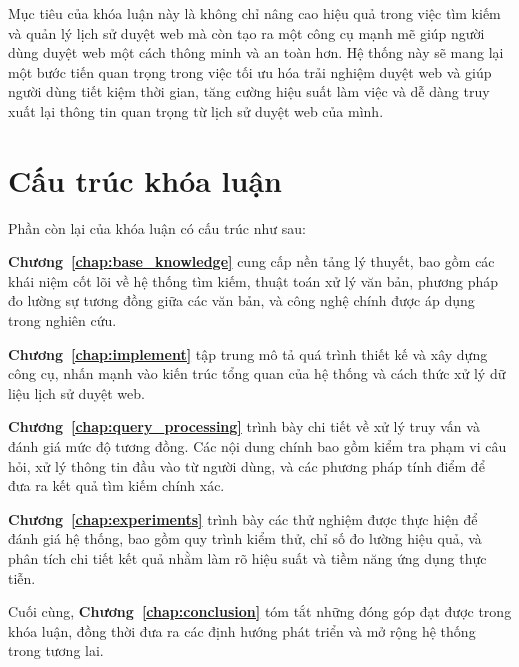 Mục tiêu của khóa luận này là không chỉ nâng cao hiệu quả trong việc tìm kiếm và quản lý lịch sử duyệt web mà còn tạo ra một công cụ mạnh mẽ giúp người dùng duyệt web một cách thông minh và an toàn hơn. Hệ thống này sẽ mang lại một bước tiến quan trọng trong việc tối ưu hóa trải nghiệm duyệt web và giúp người dùng tiết kiệm thời gian, tăng cường hiệu suất làm việc và dễ dàng truy xuất lại thông tin quan trọng từ lịch sử duyệt web của mình.

\section{Cấu trúc khóa luận}

Phần còn lại của khóa luận có cấu trúc như sau:

\textbf{Chương~\ref{chap:base_knowledge}} cung cấp nền tảng lý thuyết, bao gồm các khái niệm cốt lõi về hệ thống tìm kiếm, thuật toán xử lý văn bản, phương pháp đo lường sự tương đồng giữa các văn bản, và công nghệ chính được áp dụng trong nghiên cứu.

\textbf{Chương~\ref{chap:implement}} tập trung mô tả quá trình thiết kế và xây dựng công cụ, nhấn mạnh vào kiến trúc tổng quan của hệ thống và cách thức xử lý dữ liệu lịch sử duyệt web.

\textbf{Chương~\ref{chap:query_processing}} trình bày chi tiết về xử lý truy vấn và đánh giá mức độ tương đồng. Các nội dung chính bao gồm kiểm tra phạm vi câu hỏi, xử lý thông tin đầu vào từ người dùng, và các phương pháp tính điểm để đưa ra kết quả tìm kiếm chính xác.

\textbf{Chương~\ref{chap:experiments}} trình bày các thử nghiệm được thực hiện để đánh giá hệ thống, bao gồm quy trình kiểm thử, chỉ số đo lường hiệu quả, và phân tích chi tiết kết quả nhằm làm rõ hiệu suất và tiềm năng ứng dụng thực tiễn.

Cuối cùng, \textbf{Chương~\ref{chap:conclusion}} tóm tắt những đóng góp đạt được trong khóa luận, đồng thời đưa ra các định hướng phát triển và mở rộng hệ thống trong tương lai.
